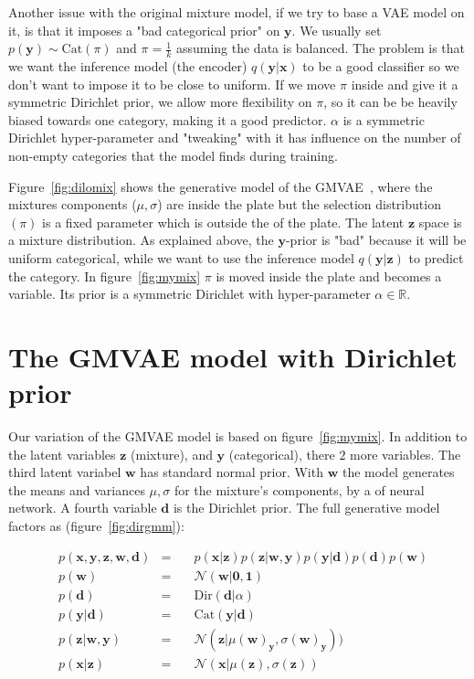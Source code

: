 \documentclass[11pt, a4paper]{report}
\theoremstyle{plain}
\theoremstyle{definition}
\theoremstyle{remark}
\newcommand{\R}{\mathbb{R}}
\newcommand{\x}{\mathbf{x}}
\newcommand{\z}{\mathbf{z}}
\newcommand{\y}{\mathbf{y}}
\newcommand{\w}{\mathbf{w}}
\newcommand{\dd}{\mathbf{d}}
\newcommand{\NN}{\mathcal{N}}
\newcommand{\bv}[1]{\boldsymbol{#1}}
\begin{document}
Another issue with the original mixture model, if we try to base a VAE model on
it, is that it imposes a "bad categorical prior" on $\y$. We usually set $p(\y) \sim
\text{Cat}(\pi)$ and $\pi=\frac{1}{k}$ assuming the data is balanced. The
problem is that we want the inference model (the encoder) $q(\y | \x)$ to be a
good classifier so we don't want to impose it to be close to uniform. 
If we move
$\pi$ inside and give it a symmetric Dirichlet prior, we allow more
flexibility on $\pi$, so it can be be heavily biased towards one category, making it a good
predictor. $\alpha$ is a symmetric Dirichlet hyper-parameter and "tweaking" with
it has influence on the number of non-empty categories that the model finds
during training.

Figure~\ref{fig:dilomix} shows the generative model of the
GMVAE~\cite{dilokthanakul2016deep}, where the mixtures components ($\mu,
\sigma$) are inside the plate but the selection distribution $(\pi)$ is a fixed
parameter which is outside the of the plate. The latent $\z$ space is a mixture
distribution. As explained above, the $\y$-prior is "bad" because it will be
uniform categorical, while we want to use the inference model $q(\y | \z)$ to
predict the category. In figure~\ref{fig:mymix} $\pi$ is moved inside the plate
and becomes a variable. Its prior is a symmetric Dirichlet with hyper-parameter
$\alpha \in \R$.

\section{The GMVAE model with Dirichlet prior}

Our variation of the GMVAE model is based on figure~\ref{fig:mymix}.
In addition to the latent variables $\z$ (mixture), and $\y$ (categorical), there
$2$ more variables.
The third latent variabel $\w$ has standard normal prior.
With $\w$ the model generates the means and variances $\mu,
\sigma$ for the mixture's components, by a of neural network.
A fourth variable $\dd$ is the Dirichlet prior.
The full generative model factors as (figure~\ref{fig:dirgmm}):

\begin{equation}
\begin{aligned}
&p(\x, \y, \z, \w, \dd) &=\quad& 
p(\x | \z) p(\z | \w, \y) p(\y | \dd) p(\dd) p(\w) \\
&p(\w) &=\quad& \NN(\w | \bv{0},\bv{1}) \\
&p(\dd) &=\quad& \text{Dir}(\dd | \alpha) \\
&p(\y | \dd) &=\quad& \text{Cat}(\y | \dd) \\
&p(\z | \w, \y) &=\quad& \NN(\z | \mu(\w)_{\y}, \sigma(\w)_{\y})) \\
&p(\x | \z) &=\quad& \NN(\x | \mu(\z), \sigma(\z))
\label{eq:gmmfact}
\end{aligned}
\end{equation}
\end{document}
